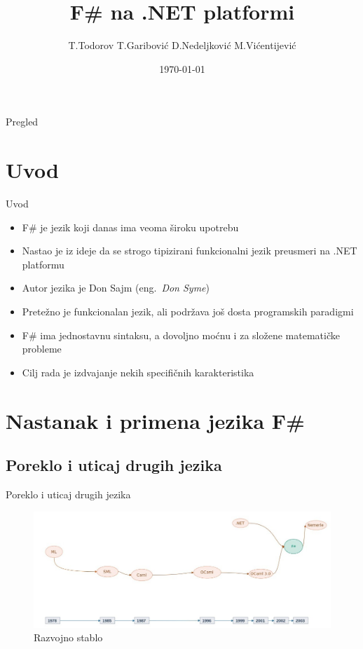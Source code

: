 \documentclass{beamer}
\title{F\# na .NET platformi}
\author{T.Todorov T.Garibović D.Nedeljković M.Vićentijević}
\date{\today}
\begin{document}
\begin{frame}
  \titlepage
\end{frame}

\begin{frame}{Pregled}
  \tableofcontents
\end{frame}

\section{Uvod}

\begin{frame}{Uvod}
\begin{itemize}
\item F\# je jezik koji danas ima veoma široku upotrebu
\item Nastao je iz ideje da se strogo tipizirani funkcionalni jezik preusmeri na .NET platformu
\item Autor jezika je Don Sajm (eng.~{\em Don Syme})
\item Pretežno je funkcionalan jezik, ali podržava još dosta programskih paradigmi
\item F\# ima jednostavnu sintaksu, a dovoljno moćnu i za složene matematičke probleme
\item Cilj rada je izdvajanje nekih specifičnih karakteristika
\end{itemize}
\end{frame}

\section{Nastanak i primena jezika F\#}
\subsection*{Poreklo i uticaj drugih jezika}
\begin{frame}{Poreklo i uticaj drugih jezika}

\begin{figure}
\begin{center}
\includegraphics[scale=0.3]{stablo.jpg}
\end{center}
\caption{Razvojno stablo}
\end{figure}

\end{frame}
\end{document}

